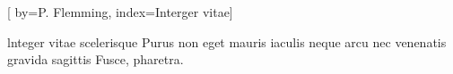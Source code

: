 [
by={P. Flemming},
index={Interger vitae}]

\beginverse*	
lnteger vitae scelerisque Purus
non eget mauris iaculis neque arcu
nec venenatis
gravida sagittis
Fusce, pharetra.
\endverse
\endsong


